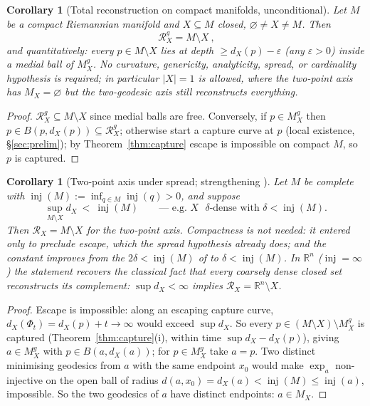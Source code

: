 \documentclass[11pt]{article}
\newtheorem{corollary}[theorem]{Corollary}
\theoremstyle{remark}
\newcommand{\R}{\mathbb{R}}
\newcommand{\X}{X}
\newcommand{\Mx}{M_{\X}}
\newcommand{\Mg}{M^{g}_{\X}}
\newcommand{\Rx}{\mathcal{R}_{\X}}
\newcommand{\Rg}{\mathcal{R}^{g}_{\X}}
\newcommand{\dX}{d_{\X}}
\newcommand{\inj}{\operatorname{inj}}
\begin{document}
\begin{corollary}[Total reconstruction on compact manifolds,
unconditional]\label{cor:compact}
Let $M$ be a compact Riemannian manifold and $\X\subseteq M$ closed,
$\varnothing\neq\X\neq M$. Then
\[
  \boxed{\ \Rg=M\setminus\X\ },
\]
and quantitatively: every $p\in M\setminus\X$ lies at depth
$\ge\dX(p)-\varepsilon$ (any $\varepsilon>0$) inside a medial ball of
$\Mg$. No curvature, genericity, analyticity, spread, or cardinality
hypothesis is required; in particular $|\X|=1$ is allowed, where the
two-point axis has $\Mx=\varnothing$ but the two-geodesic axis still
reconstructs everything.
\end{corollary}

\begin{proof}
$\Rg\subseteq M\setminus\X$ since medial balls are free. Conversely,
if $p\in\Mg$ then $p\in B(p,\dX(p))\subseteq\Rg$; otherwise start a
capture curve at $p$ (local existence, \S\ref{sec:prelim}); by
Theorem~\ref{thm:capture} escape is impossible on compact $M$, so $p$
is captured.
\end{proof}

\begin{corollary}[Two-point axis under spread; strengthening
{\cite[Thm.~6.1]{Sph}}]\label{cor:spread}
Let $M$ be complete with $\inj(M):=\inf_{q\in M}\inj(q)>0$, and
suppose
\[
  \sup_{M\setminus\X}\dX\ <\ \inj(M)
  \qquad\text{--- e.g.\ $\X$ $\delta$-dense with $\delta<\inj(M)$.}
\]
Then $\Rx=M\setminus\X$ for the two-point axis. Compactness is not
needed: it entered \cite[Thm.~6.1]{Sph} only to preclude escape,
which the spread hypothesis already does; and the constant improves
from the $2\delta<\inj(M)$ of \cite[Thm.~6.1]{Sph} to
$\delta<\inj(M)$. In $\R^{n}$ ($\inj=\infty$) the statement recovers
the classical fact that every coarsely dense closed set reconstructs
its complement: $\sup\dX<\infty$ implies $\Rx=\R^{n}\setminus\X$.
\end{corollary}

\begin{proof}
Escape is impossible: along an escaping capture curve,
$\dX(\Phi_{t})=\dX(p)+t\to\infty$ would exceed $\sup\dX$. So every
$p\in(M\setminus\X)\setminus\Mg$ is captured
(Theorem~\ref{thm:capture}(i), within time $\sup\dX-\dX(p)$), giving
$a\in\Mg$ with $p\in B(a,\dX(a))$; for $p\in\Mg$ take $a=p$. Two
distinct minimising geodesics from $a$ with the same endpoint
$x_{0}$ would make $\exp_{a}$ non-injective on the open ball of
radius $d(a,x_{0})=\dX(a)<\inj(M)\le\inj(a)$, impossible. So the two
geodesics of $a$ have distinct endpoints: $a\in\Mx$.
\end{proof}
\end{document}
